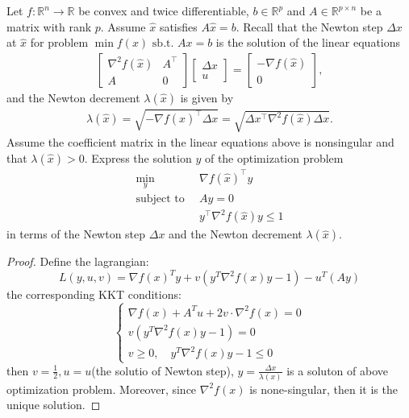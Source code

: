 \documentclass{article}
\theoremstyle{remark}
\theoremstyle{definition}
\newcommand{\st}{\mathop{\mathrm{subject\,\,to}}}
\newcommand{\reals}{\mathbb R}
\begin{document}
Let $f: \reals^n \rightarrow \reals$ be convex and twice differentiable, $b \in \reals^p$ and $A \in \reals^{p \times n}$ be a matrix with rank $p$. Assume $\hat x$ satisfies $A \hat x = b$.
Recall that the Newton step $\Delta x$ at $\hat x$ for problem $\min f(x)\,\, \textrm{sb.t.}\,\, Ax = b$ is the solution of the linear equations
\begin{align}
    \begin{bmatrix}
        \nabla^2 f(\hat x) & A^\top \\ A & 0
    \end{bmatrix}
    \begin{bmatrix}
        \Delta x \\ u
    \end{bmatrix}
    = 
    \begin{bmatrix}
        - \nabla f(\hat x) \\ 0
    \end{bmatrix},
\end{align}
and the Newton decrement $\lambda(\hat x)$ is given by
\begin{align}
    \lambda(\hat x) = \sqrt{- \nabla f(\hat x)^\top \Delta x} = \sqrt{ \Delta x^\top \nabla^2 f(\hat x) \Delta x}.
\end{align}
Assume the coefficient matrix in the linear equations above is nonsingular and that $\lambda(\hat x) > 0$. 
Express the solution $y$ of the optimization problem
\begin{align}
    \min_{y} \,\,\,& \nabla f(\hat x)^\top y \label{eqn:newtondecopt}\\
    \st \,\,\,& Ay = 0\\
        & y^\top \nabla^2 f(\hat x) y \leq 1
\end{align}
in terms of the Newton step $\Delta x$ and the Newton decrement $\lambda(\hat x)$.

\begin{proof}
Define the lagrangian:
\[L(y,u,v)= \nabla f(x)^Ty +v(y^T\nabla^2f(x)y-1)-u^T(Ay)\]
the corresponding KKT conditions:
\[
\begin{cases}
\nabla f(x) + A^T u +2v\cdot\nabla^2f(x) =0\\
v(y^T\nabla^2f(x)y-1)=0\\
v\geq 0, \quad y^T\nabla^2f(x)y-1\leq 0
\end{cases}
\]
then $v=\frac{1}{2}, u= u$(the solutio of Newton step), $y= \frac{\Delta x}{\lambda(x)}$ is a soluton of above optimization problem. Moreover, since $\nabla^2f(x)$ is none-singular, then it is the unique solution.
 
\end{proof}
\end{document}
